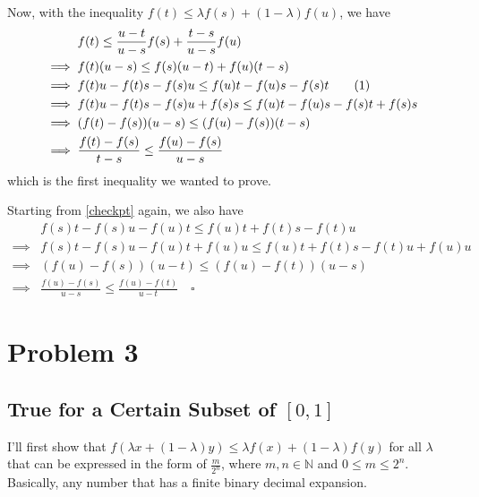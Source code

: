 \documentclass[12pt]{article}
\newcommand{\N}{\mathbb{N}}
\begin{document}
Now, with the inequality $f(t) \le \lambda f(s) + (1 - \lambda)f(u)$, we have
\begin{align*}
             & f(t) \le \frac{u-t}{u-s}f(s) + \frac{t-s}{u-s}f(u)                                                      \\
  \implies{} & f(t)(u-s) \le f(s)(u-t) + f(u)(t-s)                                                                     \\
  \implies{} & f(t)u - f(t)s - f(s)u \le f(u)t - f(u)s - f(s)t \stepcounter{equation}\tag{\theequation}\label{checkpt} \\
  \implies{} & f(t)u - f(t)s - f(s)u + f(s)s \le f(u)t - f(u)s - f(s)t + f(s)s                                         \\
  \implies{} & (f(t)-f(s))(u-s) \le (f(u)-f(s))(t-s)                                                                   \\
  \implies{} & \frac{f(t)-f(s)}{t-s} \le \frac{f(u)-f(s)}{u-s}
\end{align*}
which is the first inequality we wanted to prove.

Starting from \ref{checkpt} again, we also have
\begin{align*}
             & f(s)t - f(s)u- f(u)t \le f(u)t + f(t)s - f(t)u                  \\
  \implies{} & f(s)t - f(s)u- f(u)t + f(u)u \le f(u)t + f(t)s - f(t)u  + f(u)u \\
  \implies{} & (f(u)-f(s))(u-t) \le (f(u)-f(t))(u-s)                           \\
  \implies{} & \frac{f(u)-f(s)}{u-s} \le \frac{f(u)-f(t)}{u-t}\quad\square
\end{align*}

\pagebreak

\section{Problem 3}

\subsection{True for a Certain Subset of \texorpdfstring{$[0, 1]$}{[0, 1]}}

I'll first show that $f(\lambda x + (1-\lambda)y) \le \lambda f(x) + (1-\lambda) f(y)$
for all $\lambda$ that can be expressed in the form of $\frac{m}{2^n}$, where $m, n \in \N$ and $0 \le m \le 2^n$.
Basically, any number that has a finite binary decimal expansion.
\end{document}
